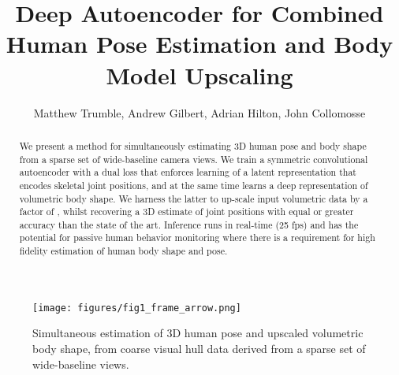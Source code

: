 \documentclass[runningheads]{llncs}
\begin{document}
\pagestyle{headings}
\mainmatter

\title{Deep Autoencoder for Combined Human Pose Estimation and Body Model Upscaling} 






\author{Matthew Trumble, Andrew Gilbert, Adrian Hilton, John Collomosse}





\newcommand{\etal}{{\em et~al.}\xspace}
\newcommand{\eg}{e.\,g.\xspace}
\newcommand{\ie}{i.\,e.\xspace}
\newcommand{\squeezeup}{\vspace{-4mm}}

\maketitle

\begin{abstract}
We present a method for simultaneously estimating 3D human pose and body shape from a sparse set of wide-baseline camera views.  We train a symmetric convolutional autoencoder with a dual loss that enforces learning of a latent representation that encodes skeletal joint positions, and at the same time learns a deep representation of volumetric body shape.  We harness the latter to up-scale input volumetric data by a factor of , whilst recovering a 3D estimate of joint positions with equal or greater accuracy than the state of the art.  Inference runs in real-time (25 fps) and has the potential for passive human behavior monitoring where there is a requirement for high fidelity estimation of human body shape and pose.

\end{abstract}
\squeezeup
\squeezeup
\squeezeup
\begin{figure}
\centering
\texttt{[image: figures/fig1\_frame\_arrow.png]}
\caption{Simultaneous estimation of 3D human pose and  upscaled volumetric body shape, from coarse visual hull data derived from a sparse set of wide-baseline views.}
\label{fig:teaser_totalcap}
\squeezeup
\squeezeup
\squeezeup
\end{figure}
\end{document}

